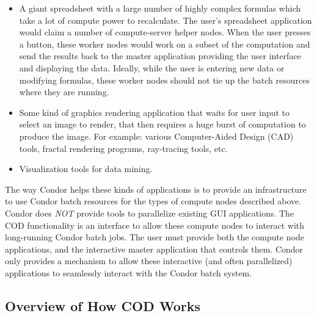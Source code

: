 \begin{itemize}

\item A giant spreadsheet with a large number of highly complex
  formulas which take a lot of compute power to recalculate.
  The user's spreadsheet application would claim a number of
  compute-server helper nodes.
  When the user presses a \verb@recalculate@ button, these worker
  nodes would work on a subset of the computation and send the results
  back to the master application providing the user interface and
  displaying the data.
  Ideally, while the user is entering new data or modifying formulas,
  these worker nodes should not tie up the batch resources where they
  are running.

\item Some kind of graphics rendering application that waits for user
  input to select an image to render, that then requires a huge burst
  of computation to produce the image.
  For example: various Computer-Aided Design (CAD) tools, fractal
  rendering programs, ray-tracing tools, etc.
 
\item Visualization tools for data mining.

\end{itemize}

The way Condor helps these kinds of applications is to provide an
infrastructure to use Condor batch resources for the types of compute
nodes described above.
Condor does \emph{NOT} provide tools to parallelize existing GUI
applications.
The COD functionality is an interface to allow these compute nodes to
interact with long-running Condor batch jobs.
The user must provide both the compute node applications, and the
interactive master application that controls them.
Condor only provides a mechanism to allow these interactive (and often
parallelized) applications to seamlessly interact with the Condor
batch system.


\subsection{\label{sec:cod-overview}
Overview of How COD Works}

\Todo

%


